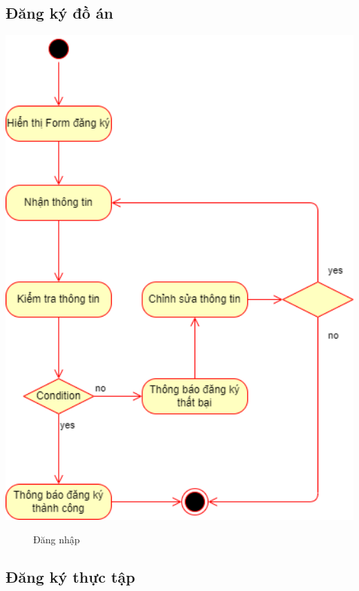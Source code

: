 \subsection{Đăng ký đồ án}
  \begin{center}
    \includegraphics[width=1.1\textwidth]{image/activity/register_doan.png}
    \begin{figure}
      \centering
      \caption{Đăng nhập}
    \end{figure}
  \end{center}

\subsection{Đăng ký thực tập}
